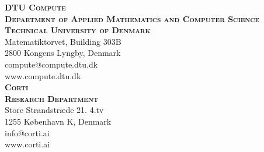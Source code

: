 
\thispagestyle{empty} %

\vspace*{\fill}
\small\sffamily
\noindent
\textsc{\textbf{DTU Compute}}\\
\textsc{\textbf{Department of Applied Mathematics and Computer Science}}\\
\textsc{\textbf{Technical University of Denmark}}
\smallskip\\
Matematiktorvet, Building 303B\\
2800 Kongens Lyngby, Denmark\\
compute@compute.dtu.dk\\
www.compute.dtu.dk
\bigskip\\
\noindent
\textsc{\textbf{Corti}}\\
\textsc{\textbf{Research Department}}
\smallskip\\
Store Strandstræde 21. 4.tv\\
1255 København K, Denmark\\
info@corti.ai\\
www.corti.ai\\

\normalsize
\normalfont